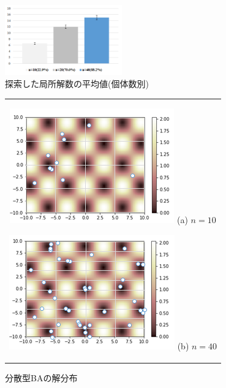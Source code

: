 \documentclass{jarticle}
\begin{document}
\begin{figure}[h]
\begin{center}
\includegraphics[width=0.45\textwidth]{population.bmp}
\caption{探索した局所解数の平均値(個体数別)}
\label{fig:pop*fit}
\end{center}
\end{figure}

\begin{figure}[h]
\begin{center}
\begin{tabular}{c}

\begin{minipage}[t]{0.45\linewidth}
\begin{center}
\includegraphics[keepaspectratio, scale=0.45]{sbat01_n10.bmp} (a) ${n=10}$
\end{center}
\end{minipage}

\begin{minipage}[t]{0.45\linewidth}
\begin{center}
\includegraphics[keepaspectratio, scale=0.45]{sbat01_n40.bmp} (b) ${n=40}$
\end{center}
\end{minipage}\\

\end{tabular}
\caption{分散型BAの解分布}
\label{fig:pop*pbestposition}
\end{center}
\end{figure}
\end{document}
